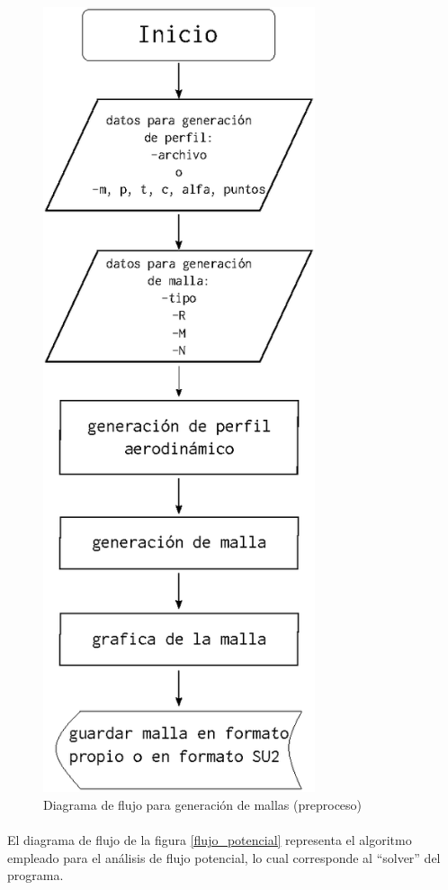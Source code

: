 \documentclass[letterpaper, openright, 12pt]{book}
\begin{document}
    \begin{figure}[htbp!]
        \centering
        \includegraphics[keepaspectratio, width=80mm]{./Imagenes/flujo_malla}
        \caption{Diagrama de flujo para generación de mallas (preproceso)}
        \label{flujo_malla}
    \end{figure}

    \paragraph*{}
        El diagrama de flujo de la figura \ref{flujo_potencial} representa el
        algoritmo empleado para el análisis de flujo potencial, lo cual
        corresponde al ``solver'' del programa.
\end{document}
